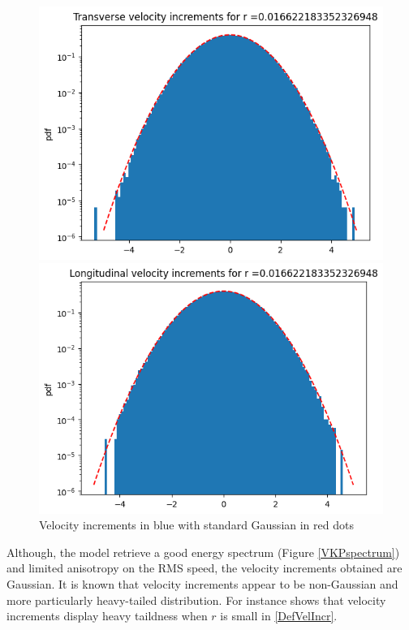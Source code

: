 \documentclass[a4paper,12pt]{article}
\theoremstyle{definition}
\begin{document}
\begin{figure}[H]
    \centering
    \begin{minipage}{0.49\textwidth}
        \centering
        \includegraphics[width=\linewidth]{illustrations/TransVelIncrExample.png}
    \end{minipage}
    \hfill
    \begin{minipage}{0.49\textwidth}
        \centering
        \includegraphics[width=\linewidth]{illustrations/LongVelIncrExample.png}
    \end{minipage}
    \caption{Velocity increments in blue with standard Gaussian in red dots}
\end{figure}


\bigskip
Although, the model retrieve a good energy spectrum (Figure \ref{VKPspectrum}) and limited anisotropy on the RMS speed, the velocity increments obtained are Gaussian. It is known that velocity increments appear to be non-Gaussian and more particularly heavy-tailed distribution. For instance \cite{JIMENEZ1998405} shows that velocity increments display heavy taildness when $r$ is small in \ref{DefVelIncr}.
\end{document}
